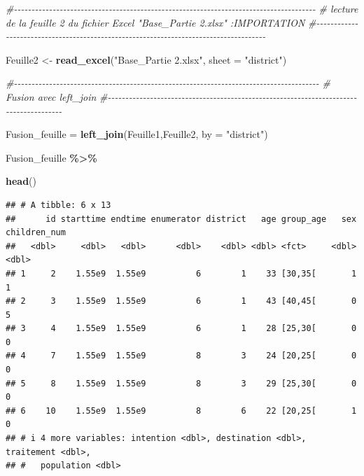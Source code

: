\documentclass[
]{article}
\newenvironment{Shaded}{\begin{snugshade}}{\end{snugshade}}
\newcommand{\AttributeTok}[1]{\textcolor[rgb]{0.13,0.29,0.53}{#1}}
\newcommand{\CommentTok}[1]{\textcolor[rgb]{0.56,0.35,0.01}{\textit{#1}}}
\newcommand{\FunctionTok}[1]{\textcolor[rgb]{0.13,0.29,0.53}{\textbf{#1}}}
\newcommand{\NormalTok}[1]{#1}
\newcommand{\OtherTok}[1]{\textcolor[rgb]{0.56,0.35,0.01}{#1}}
\newcommand{\SpecialCharTok}[1]{\textcolor[rgb]{0.81,0.36,0.00}{\textbf{#1}}}
\newcommand{\StringTok}[1]{\textcolor[rgb]{0.31,0.60,0.02}{#1}}
\begin{document}
\begin{Shaded}
\begin{Highlighting}[]
\CommentTok{\#{-}{-}{-}{-}{-}{-}{-}{-}{-}{-}{-}{-}{-}{-}{-}{-}{-}{-}{-}{-}{-}{-}{-}{-}{-}{-}{-}{-}{-}{-}{-}{-}{-}{-}{-}{-}{-}{-}{-}{-}{-}{-}{-}{-}{-}{-}{-}{-}{-}{-}{-}{-}{-}{-}{-}{-}{-}{-}{-}{-}{-}{-}{-}{-}{-}{-}{-}{-}{-}{-}{-}{-}{-}{-}{-}{-}{-}{-}{-}{-}{-}{-}{-}{-}{-}{-}}
\CommentTok{\# lecture de la feuille 2 du fichier Excel "Base\_Partie 2.xlsx" :IMPORTATION  }
\CommentTok{\#{-}{-}{-}{-}{-}{-}{-}{-}{-}{-}{-}{-}{-}{-}{-}{-}{-}{-}{-}{-}{-}{-}{-}{-}{-}{-}{-}{-}{-}{-}{-}{-}{-}{-}{-}{-}{-}{-}{-}{-}{-}{-}{-}{-}{-}{-}{-}{-}{-}{-}{-}{-}{-}{-}{-}{-}{-}{-}{-}{-}{-}{-}{-}{-}{-}{-}{-}{-}{-}{-}{-}{-}{-}{-}{-}{-}{-}{-}{-}{-}{-}{-}{-}{-}{-}{-}}

\NormalTok{Feuille2 }\OtherTok{\textless{}{-}} \FunctionTok{read\_excel}\NormalTok{(}\StringTok{"Base\_Partie 2.xlsx"}\NormalTok{,}
\AttributeTok{sheet =} \StringTok{"district"}\NormalTok{)}

\CommentTok{\#{-}{-}{-}{-}{-}{-}{-}{-}{-}{-}{-}{-}{-}{-}{-}{-}{-}{-}{-}{-}{-}{-}{-}{-}{-}{-}{-}{-}{-}{-}{-}{-}{-}{-}{-}{-}{-}{-}{-}{-}{-}{-}{-}{-}{-}{-}{-}{-}{-}{-}{-}{-}{-}{-}{-}{-}{-}{-}{-}{-}{-}{-}{-}{-}{-}{-}{-}{-}{-}{-}{-}{-}{-}{-}{-}{-}{-}{-}{-}{-}{-}{-}{-}{-}{-}{-}{-}}
\CommentTok{\#             Fusion avec left\_join }
\CommentTok{\#{-}{-}{-}{-}{-}{-}{-}{-}{-}{-}{-}{-}{-}{-}{-}{-}{-}{-}{-}{-}{-}{-}{-}{-}{-}{-}{-}{-}{-}{-}{-}{-}{-}{-}{-}{-}{-}{-}{-}{-}{-}{-}{-}{-}{-}{-}{-}{-}{-}{-}{-}{-}{-}{-}{-}{-}{-}{-}{-}{-}{-}{-}{-}{-}{-}{-}{-}{-}{-}{-}{-}{-}{-}{-}{-}{-}{-}{-}{-}{-}{-}{-}{-}{-}{-}{-}{-}}

\NormalTok{Fusion\_feuille }\OtherTok{=} \FunctionTok{left\_join}\NormalTok{(Feuille1,Feuille2, }\AttributeTok{by =} \StringTok{"district"}\NormalTok{)}

\NormalTok{Fusion\_feuille }\SpecialCharTok{\%\textgreater{}\%}
  
  \FunctionTok{head}\NormalTok{() }
\end{Highlighting}
\end{Shaded}

\begin{verbatim}
## # A tibble: 6 x 13
##      id starttime endtime enumerator district   age group_age   sex children_num
##   <dbl>     <dbl>   <dbl>      <dbl>    <dbl> <dbl> <fct>     <dbl>        <dbl>
## 1     2    1.55e9  1.55e9          6        1    33 [30,35[       1            1
## 2     3    1.55e9  1.55e9          6        1    43 [40,45[       0            5
## 3     4    1.55e9  1.55e9          6        1    28 [25,30[       0            0
## 4     7    1.55e9  1.55e9          8        3    24 [20,25[       0            0
## 5     8    1.55e9  1.55e9          8        3    29 [25,30[       0            0
## 6    10    1.55e9  1.55e9          8        6    22 [20,25[       1            0
## # i 4 more variables: intention <dbl>, destination <dbl>, traitement <dbl>,
## #   population <dbl>
\end{verbatim}
\end{document}
